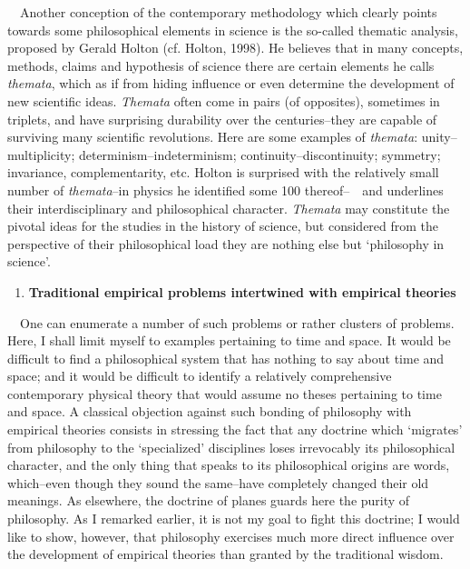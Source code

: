 \documentclass[a4paper]{article}
\begin{document}
\ \ Another conception of the contemporary methodology which clearly points towards some philosophical elements in
science is the so-called thematic analysis, proposed by Gerald Holton \label{ref:RNDQaGpAxlOZj}(cf. Holton, 1998). He
believes that in many concepts, methods, claims and hypothesis of science there are certain elements he calls
\textit{themata}, which as if from hiding influence or even determine the development of new scientific ideas.
\textit{Themata} often come in pairs (of opposites), sometimes in triplets, and have surprising durability over the
centuries–they are capable of surviving many scientific revolutions. Here are some examples of \textit{themata}:
unity–multiplicity; determinism–indeterminism; continuity–discontinuity; symmetry; invariance, complementarity, etc.
Holton is surprised with the relatively small number of \textit{themata}–in physics he identified some 100
thereof–\ \ and underlines their interdisciplinary and philosophical character. \textit{Themata} may constitute the
pivotal ideas for the studies in the history of science, but considered from the perspective of their philosophical
load they are nothing else but ‘philosophy in science’.

\begin{enumerate}
\item {\bfseries
Traditional empirical problems intertwined with empirical theories}
\end{enumerate}
\ \ One can enumerate a number of such problems or rather clusters of problems. Here, I shall limit myself to examples
pertaining to time and space. It would be difficult to find a philosophical system that has nothing to say about time
and space; and it would be difficult to identify a relatively comprehensive contemporary physical theory that would
assume no theses pertaining to time and space. A classical objection against such bonding of philosophy with empirical
theories consists in stressing the fact that any doctrine which ‘migrates’ from philosophy to the ‘specialized’
disciplines loses irrevocably its philosophical character, and the only thing that speaks to its philosophical origins
are words, which–even though they sound the same–have completely changed their old meanings. As elsewhere, the doctrine
of planes guards here the purity of philosophy. As I remarked earlier, it is not my goal to fight this doctrine; I
would like to show, however, that philosophy exercises much more direct influence over the development of empirical
theories than granted by the traditional wisdom.
\end{document}
